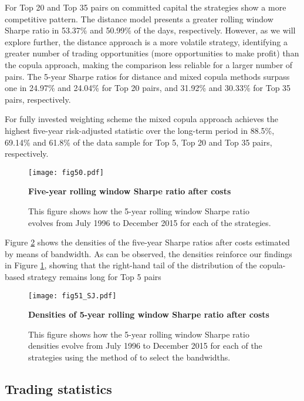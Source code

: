 \documentclass[a4paper]{article}
\begin{document}
For Top 20 and Top 35 pairs on committed capital the strategies show a more competitive pattern. The distance model presents a greater rolling window Sharpe ratio in 53.37\% and 50.99\% of the days, respectively. However, as we will explore further, the distance approach is a more volatile strategy, identifying a greater number of trading opportunities (more opportunities to make profit) than the copula approach, making the comparison less reliable for a larger number of pairs. The 5-year Sharpe ratios for distance and mixed copula methods surpass one in 24.97\% and 24.04\% for Top 20 pairs, and 31.92\% and 30.33\% for Top 35 pairs, respectively.

For fully invested weighting scheme the mixed copula approach achieves the highest five-year risk-adjusted statistic over the long-term period in 88.5\%, 69.14\% and 61.8\% of the data sample for Top 5, Top 20 and Top 35 pairs, respectively.


\begin{figure}[H]
\centering
\texttt{[image: fig50.pdf]}
\caption{\textbf{Five-year rolling window Sharpe ratio after costs}}
\caption*{\scriptsize This figure shows how the 5-year rolling window Sharpe ratio evolves from July 1996 to December 2015 for each of the strategies.}
\label{fig:fig50}
\end{figure}

\vspace{0.6cm}

Figure \ref{fig:fig51} shows the densities of the five-year Sharpe ratios after costs estimated by means of \citet*{sj1991} bandwidth. As can be observed, the densities reinforce our findings in Figure \ref{fig:fig50}, showing that the right-hand tail of the distribution of the copula-based strategy remains long for Top 5 pairs


\begin{figure}[H]
	\centering
	\texttt{[image: fig51\_SJ.pdf]}
	\caption{\textbf{Densities of 5-year rolling window Sharpe ratio after costs}}
	\caption*{\scriptsize This figure shows how the 5-year rolling window Sharpe ratio densities evolve from July 1996 to December 2015 for each of the strategies using the method of \citet*{sj1991} to select the bandwidths.}
	\label{fig:fig51}
\end{figure}

\vspace{0.6cm}


	
	\subsection{Trading statistics}
	
\end{document}

